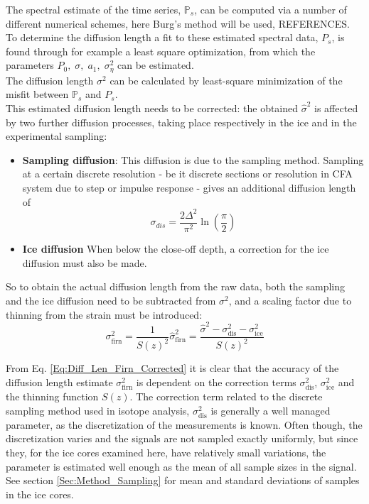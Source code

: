 \documentclass[../../CompleteThesis/Complete_1stDraft.tex]{subfiles}
\begin{document}
The spectral estimate of the time series, $\mathbb{P}_s$, can be computed via a number of different numerical schemes, here Burg's method will be used, REFERENCES. To determine the diffusion length a fit to these estimated spectral data, $P_s$, is found through for example a least square optimization, from which the parameters $P_0, \; \sigma, \; a_1, \; \sigma_{\eta}^2$ can be estimated.\\
The diffusion length $\sigma^2$ can be calculated by least-square minimization of the misfit between $\mathbb{P}_s$ and $P_s$.\\
This estimated diffusion length needs to be corrected: the obtained $\hat{\sigma}^2$ is affected by two further diffusion processes, taking place respectively in the ice and in the experimental sampling:
\begin{itemize}
	\item \textbf{Sampling diffusion}: This diffusion is due to the sampling method. Sampling at a certain discrete resolution - be it discrete sections or resolution in CFA system due to step or impulse response - gives an additional diffusion length of
	\begin{equation}
		\sigma_{dis} = \frac{2 \Delta^2}{\pi^2}\ln\left(\frac{\pi}{2}\right)
		\label{Eq:Diff_Len_corr_Discrete}
	\end{equation}
	\item \textbf{Ice diffusion} When below the close-off depth, a correction for the ice diffusion must also be made.
\end{itemize} 

So to obtain the actual diffusion length from the raw data, both the sampling and the ice diffusion need to be subtracted from $\sigma^2$, and a scaling factor due to thinning from the strain must be introduced:
\begin{equation}
	\sigma_{\text{firn}}^2 = \frac{1}{S(z)^2}\hat{\sigma}_{\text{firn}}^2 = \frac{\hat{\sigma}^2 - \sigma_{\text{dis}}^2 - \sigma_{\text{ice}}^2}{S(z)^2}
	\label{Eq:Diff_Len_Firn_Corrected}
\end{equation}

From Eq. \ref{Eq:Diff_Len_Firn_Corrected} it is clear that the accuracy of the diffusion length estimate $\sigma_{\text{firn}}^2$ is dependent on the correction terms $\sigma_{\text{dis}}^2$, $\sigma_{\text{ice}}^2$ and the thinning function $S(z)$. The correction term related to the discrete sampling method used in isotope analysis, $\sigma_{\text{dis}}^2$ is generally a well managed parameter, as the discretization of the measurements is known. Often though, the discretization varies and the signals are not sampled exactly uniformly, but since they, for the ice cores examined here, have relatively small variations, the parameter is estimated well enough as the mean of all sample sizes in the signal. See section \ref{Sec:Method_Sampling} for mean and standard deviations of samples in the ice cores.
\end{document}
